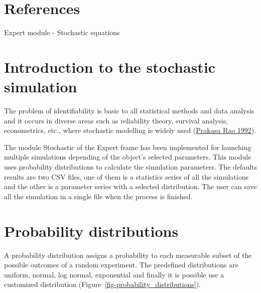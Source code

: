 \documentclass[
  letterpaper,
  DIV=11,
  numbers=noendperiod]{scrreprt}
\begin{document}
\hypertarget{references-5}{%
\chapter*{References}\label{references-5}}

Expert module - Stochastic equations

\hypertarget{sec-tech_stochastic_equations_intro}{%
\chapter{Introduction to the stochastic
simulation}\label{sec-tech_stochastic_equations_intro}}

The problem of identifiability is basic to all statistical methods and
data analysis and it occurs in diverse areas such as reliability theory,
survival analysis, econometrics, etc., where stochastic modelling is
widely used
(\protect\hyperlink{ref-prakasa_rao_identifiability_1992}{Prakasa Rao
1992}).

The module Stochastic of the Expert frame has been implemented for
launching multiple simulations depending of the object's selected
parameters. This module uses probability distributions to calculate the
simulation parameters. The defaults results are two CSV files, one of
them is a statistics series of all the simulations and the other is a
parameter series with a selected distribution. The user can save all the
simulation in a single file when the process is finished.

\hypertarget{sec-tech_stochastic_equations_distributions}{%
\chapter{Probability
distributions}\label{sec-tech_stochastic_equations_distributions}}

A probability distribution assigns a probability to each measurable
subset of the possible outcomes of a random experiment. The predefined
distributions are uniform, normal, log normal, exponential and finally
it is possible use a customized distribution
(Figure~\ref{fig-probability_distributions}).
\end{document}
